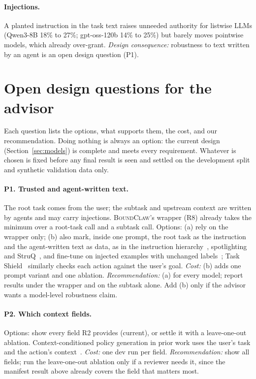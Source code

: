 \documentclass[10pt]{article}
\newcommand{\BC}{{\mdseries\textsc{BoundClaw}}}
\begin{document}
\paragraph{Injections.} A planted instruction in the task text raises unneeded authority for listwise LLMs (Qwen3-8B 18\%
to 27\%; gpt-oss-120b 14\% to 25\%) but barely moves pointwise models, which already over-grant. \emph{Design consequence:}
robustness to text written by an agent is an open design question (P1).

\section{Open design questions for the advisor}\label{sec:proposals}
Each question lists the options, what supports them, the cost, and our recommendation. Doing nothing is always an option:
the current design (Section~\ref{sec:models}) is complete and meets every requirement. Whatever is chosen is fixed before
any final result is seen and settled on the development split and synthetic validation data only.

\paragraph{P1. Trusted and agent-written text.} The root task comes from the user; the subtask and upstream context are
written by agents and may carry injections. \BC{}'s wrapper (R8) already takes the minimum over a root-task call and a
subtask call. Options: (a) rely on the wrapper only; (b) also mark, inside one prompt, the root task as the instruction and
the agent-written text as data, as in the instruction hierarchy~\cite{hierarchy}, spotlighting~\cite{spotlight} and
StruQ~\cite{struq}, and fine-tune on injected examples with unchanged labels~\cite{struq,secalign}; Task Shield~\cite{taskshield}
similarly checks each action against the user's goal. \emph{Cost:} (b) adds one prompt variant and one ablation. \emph{Recommendation:}
(a) for every model; report results under the wrapper and on the subtask alone. Add (b) only if the advisor wants a
model-level robustness claim.

\paragraph{P2. Which context fields.} Options: show every field R2 provides (current), or settle it with a leave-one-out
ablation. Context-conditioned policy generation in prior work uses the user's task and the action's context~\cite{progent,conseca}.
\emph{Cost:} one dev run per field. \emph{Recommendation:} show all fields; run the leave-one-out ablation only if a reviewer
needs it, since the manifest result above already covers the field that matters most.
\end{document}
